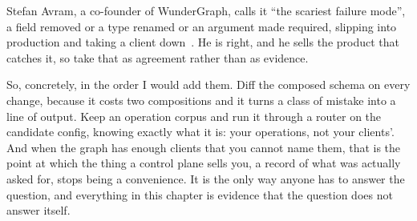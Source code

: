 %
Stefan Avram, a co-founder of WunderGraph, calls it \enquote{the scariest
failure mode}, a field removed or a type renamed or an argument made
required, slipping into production and taking a client
down~\autocite{avram2026federation}. He is right, and he sells the product that
catches it, so take that as agreement rather than as evidence.

%
So, concretely, in the order I would add them. Diff the composed schema on
every change, because it costs two compositions and it turns a class of
mistake into a line of output. Keep an operation corpus and run it through a
router on the candidate config, knowing exactly what it is: your operations,
not your clients'. And when the graph has enough clients that you cannot name
them, that is the point at which the thing a control plane sells you, a record
of what was actually asked for, stops being a convenience. It is the only way
anyone has to answer the question, and everything in this chapter is evidence
that the question does not answer itself.
%
